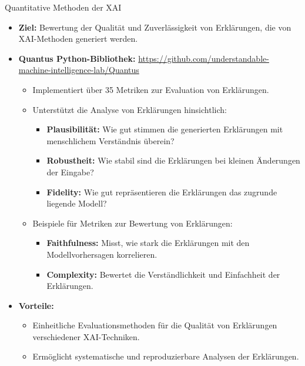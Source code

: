 \documentclass[aspectratio=1610, xcolor=dvipsnames, 9pt]{beamer}
\begin{document}
\begin{frame}{Quantitative Methoden der XAI}
  \begin{itemize}
    \item \textbf{Ziel:} Bewertung der Qualität und Zuverlässigkeit von Erklärungen, die von XAI-Methoden generiert werden.
    \item \textbf{Quantus Python-Bibliothek:} \url{https://github.com/understandable-machine-intelligence-lab/Quantus}
    \begin{itemize}
      \item Implementiert über 35 Metriken zur Evaluation von Erklärungen.
      \item Unterstützt die Analyse von Erklärungen hinsichtlich:
      \begin{itemize}
        \item \textbf{Plausibilität:} Wie gut stimmen die generierten Erklärungen mit menschlichem Verständnis überein?
        \item \textbf{Robustheit:} Wie stabil sind die Erklärungen bei kleinen Änderungen der Eingabe?
        \item \textbf{Fidelity:} Wie gut repräsentieren die Erklärungen das zugrunde liegende Modell?
      \end{itemize}
      \item Beispiele für Metriken zur Bewertung von Erklärungen:
      \begin{itemize}
        \item \textbf{Faithfulness:} Misst, wie stark die Erklärungen mit den Modellvorhersagen korrelieren.
        \item \textbf{Complexity:} Bewertet die Verständlichkeit und Einfachheit der Erklärungen.
      \end{itemize}
    \end{itemize}
    \item \textbf{Vorteile:}
    \begin{itemize}
      \item Einheitliche Evaluationsmethoden für die Qualität von Erklärungen verschiedener XAI-Techniken.
      \item Ermöglicht systematische und reproduzierbare Analysen der Erklärungen.
    \end{itemize}
  \end{itemize}
\end{frame}
\end{document}
